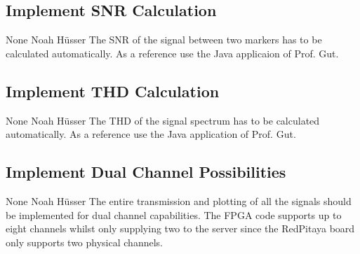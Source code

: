 \documentclass[a4paper,oneside]{alpenspecs/alpenspecs}
\begin{document}
\subsection{Implement SNR Calculation}
\label{subsec:frontend:}
\wpac
     {}
     {}
     {}
     {None}
     {}
     {Noah Hüsser}
     {%
         The SNR of the signal between two markers has to be calculated automatically.
         As a reference use the Java applicaion of Prof. Gut.
     }

\subsection{Implement THD Calculation}
\label{subsec:frontend:}
\wpac
     {}
     {}
     {}
     {None}
     {}
     {Noah Hüsser}
     {%
         The THD of the signal spectrum has to be calculated automatically.
         As a reference use the Java application of Prof. Gut.
     }

\subsection{Implement Dual Channel Possibilities}
\label{subsec:frontend:}
\wpac
     {}
     {}
     {}
     {None}
     {}
     {Noah Hüsser}
     {%
         The entire transmission and plotting of all the signals should be implemented for dual channel capabilities.
         The FPGA code supports up to eight channels whilst only supplying two to the server since the RedPitaya board only supports two physical channels.
     }


\backmatter
\end{document}

